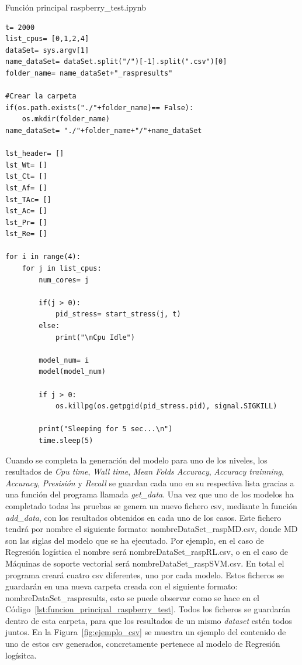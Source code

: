 \documentclass[a4paper, 12pt]{book}
\begin{document}
\begin{listing}[]
    \caption{Función principal raspberry\_test.ipynb}{}
    \label{lst:funcion_principal_raspberry_test}
    \begin{verbatim}
t= 2000
list_cpus= [0,1,2,4]
dataSet= sys.argv[1]
name_dataSet= dataSet.split("/")[-1].split(".csv")[0]
folder_name= name_dataSet+"_raspresults"

#Crear la carpeta
if(os.path.exists("./"+folder_name)== False):
    os.mkdir(folder_name)
name_dataSet= "./"+folder_name+"/"+name_dataSet

lst_header= []
lst_Wt= []
lst_Ct= []
lst_Af= []
lst_TAc= []
lst_Ac= []
lst_Pr= []
lst_Re= []

for i in range(4):
    for j in list_cpus:
        num_cores= j
        
        if(j > 0):
            pid_stress= start_stress(j, t)
        else:
            print("\nCpu Idle")
            
        model_num= i    
        model(model_num)
        
        if j > 0:
            os.killpg(os.getpgid(pid_stress.pid), signal.SIGKILL)
        
        print("Sleeping for 5 sec...\n")
        time.sleep(5)
    \end{verbatim}
\end{listing}

Cuando se completa la generación del modelo para uno de los niveles, los resultados de \textit{Cpu time}, \textit{Wall time}, \textit{Mean Folds Accuracy}, \textit{Accuracy trainning}, \textit{Accuracy}, \textit{Presisión} y \textit{Recall} se guardan cada uno en su respectiva lista gracias a una función del programa llamada \textit{get\_data}. Una vez que uno de los modelos ha completado todas las pruebas se genera un nuevo fichero csv, mediante la función \textit{add\_data}, con los resultados obtenidos en cada uno de los casos.
Este fichero tendrá por nombre el siguiente formato: nombreDataSet\_raspMD.csv, donde MD son las siglas del modelo que se ha ejecutado. Por ejemplo, en el caso de Regresión logística el nombre será nombreDataSet\_raspRL.csv, o en el caso de Máquinas de soporte vectorial será nombreDataSet\_raspSVM.csv. En total el programa creará cuatro csv diferentes, uno por cada modelo. Estos ficheros se guardarán en una nueva carpeta creada con el siguiente formato: nombreDataSet\_raspresults, esto se puede observar como se hace en el Código~\ref{lst:funcion_principal_raspberry_test}. Todos los ficheros se guardarán dentro de esta carpeta, para que los resultados de un mismo \textit{dataset} estén todos juntos. En la Figura~\ref{fig:ejemplo_csv} se muestra un ejemplo del contenido de uno de estos csv generados, concretamente pertenece al modelo de Regresión logísitca.
\end{document}
